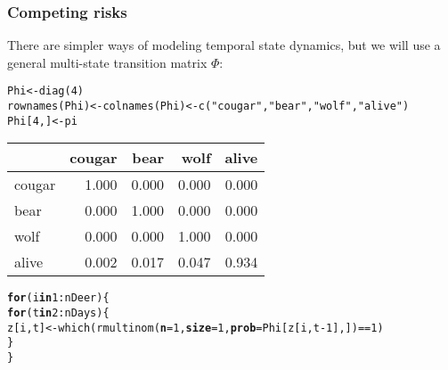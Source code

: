 \documentclass[color=usenames,dvipsnames]{beamer}\usepackage[]{graphicx}\usepackage[]{color}
\makeatletter
\newcommand{\hlnum}[1]{\textcolor[rgb]{0.69,0.494,0}{#1}}%
\newcommand{\hlstr}[1]{\textcolor[rgb]{0.749,0.012,0.012}{#1}}%
\newcommand{\hlopt}[1]{\textcolor[rgb]{0,0,0}{#1}}%
\newcommand{\hlstd}[1]{\textcolor[rgb]{0,0,0}{#1}}%
\newcommand{\hlkwa}[1]{\textcolor[rgb]{0,0,0}{\textbf{#1}}}%
\newcommand{\hlkwb}[1]{\textcolor[rgb]{0,0.341,0.682}{#1}}%
\newcommand{\hlkwc}[1]{\textcolor[rgb]{0,0,0}{\textbf{#1}}}%
\newcommand{\hlkwd}[1]{\textcolor[rgb]{0.004,0.004,0.506}{#1}}%
\newenvironment{kframe}{%
 \def\at@end@of@kframe{}%
 \ifinner\ifhmode%
  \def\at@end@of@kframe{\end{minipage}}%
  \begin{minipage}{\columnwidth}%
 \fi\fi%
 \def\FrameCommand##1{\hskip\@totalleftmargin \hskip-\fboxsep
 \colorbox{shadecolor}{##1}\hskip-\fboxsep
     \hskip-\linewidth \hskip-\@totalleftmargin \hskip\columnwidth}%
 \MakeFramed {\advance\hsize-\width
   \@totalleftmargin\z@ \linewidth\hsize
   \@setminipage}}%
 {\par\unskip\endMakeFramed%
 \at@end@of@kframe}
\newenvironment{knitrout}{}{} %
\makeatother
\begin{document}
\begin{frame}[fragile]
  \frametitle{Competing risks}
  There are simpler ways of modeling temporal state dynamics, but we
  will use a general multi-state transition matrix $\Phi$:
\begin{knitrout}\scriptsize
{}\color{fgcolor}\begin{kframe}
\begin{alltt}
\hlstd{Phi} \hlkwb{<-} \hlkwd{diag}\hlstd{(}\hlnum{4}\hlstd{)}
\hlkwd{rownames}\hlstd{(Phi)} \hlkwb{<-} \hlkwd{colnames}\hlstd{(Phi)} \hlkwb{<-} \hlkwd{c}\hlstd{(}\hlstr{"cougar"}\hlstd{,} \hlstr{"bear"}\hlstd{,} \hlstr{"wolf"}\hlstd{,} \hlstr{"alive"}\hlstd{)}
\hlstd{Phi[}\hlnum{4}\hlstd{,]} \hlkwb{<-} \hlstd{pi}
\end{alltt}
\end{kframe}
\end{knitrout}
\centering
\begin{tabular}{lrrrr}
\toprule
       & cougar & bear & wolf & alive \\
\midrule
cougar & 1.000      & 0.000 & 0.000 & 0.000  \\
bear   & 0.000      & 1.000 & 0.000 & 0.000  \\
wolf   & 0.000      & 0.000 & 1.000 & 0.000  \\
alive  & 0.002      & 0.017 & 0.047 & 0.934  \\
\bottomrule
\end{tabular}
\pause
\vfill
\begin{knitrout}\scriptsize
{}\color{fgcolor}\begin{kframe}
\begin{alltt}
\hlkwa{for}\hlstd{(i} \hlkwa{in} \hlnum{1}\hlopt{:}\hlstd{nDeer) \{}
    \hlkwa{for}\hlstd{(t} \hlkwa{in} \hlnum{2}\hlopt{:}\hlstd{nDays) \{}
        \hlstd{z[i,t]} \hlkwb{<-} \hlkwd{which}\hlstd{(}\hlkwd{rmultinom}\hlstd{(}\hlkwc{n}\hlstd{=}\hlnum{1}\hlstd{,} \hlkwc{size}\hlstd{=}\hlnum{1}\hlstd{,} \hlkwc{prob}\hlstd{=Phi[z[i,t}\hlopt{-}\hlnum{1}\hlstd{],])}\hlopt{==}\hlnum{1}\hlstd{)}
    \hlstd{\}}
\hlstd{\}}
\end{alltt}
\end{kframe}
\end{knitrout}
\end{frame}
\end{document}
